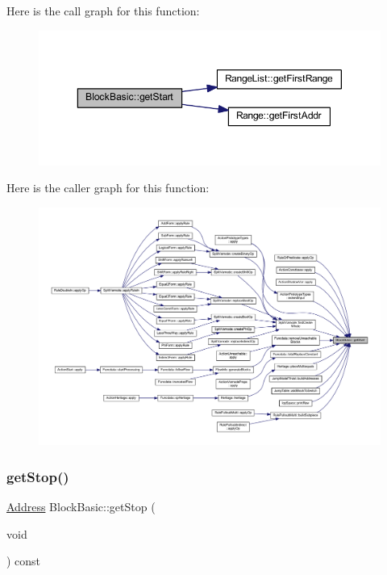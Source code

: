 Here is the call graph for this function\+:
\nopagebreak
\begin{figure}[H]
\begin{center}
\leavevmode
\includegraphics[width=350pt]{class_block_basic_a779d71352d86f6af4342b419713c03d5_cgraph}
\end{center}
\end{figure}
Here is the caller graph for this function\+:
\nopagebreak
\begin{figure}[H]
\begin{center}
\leavevmode
\includegraphics[width=350pt]{class_block_basic_a779d71352d86f6af4342b419713c03d5_icgraph}
\end{center}
\end{figure}
\mbox{\label{class_block_basic_af9fb755c152296c5f3110e9dc0f51bd3}} 
\subsubsection{\texorpdfstring{getStop()}{getStop()}}
{\footnotesize\ttfamily \mbox{\hyperlink{class_address}{Address}} Block\+Basic\+::get\+Stop (\begin{DoxyParamCaption}\item[{void}]{ }\end{DoxyParamCaption}) const\hspace{0.3cm}{\ttfamily [virtual]}}



